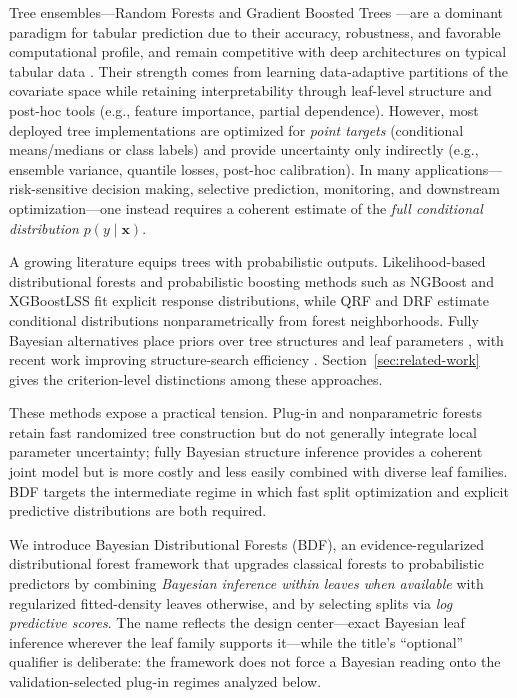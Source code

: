 \documentclass[10pt]{article} %
\begin{document}
Tree ensembles---Random Forests \citep{breiman2001random} and Gradient Boosted Trees \citep{friedman2001greedy,chen2016xgboost,ke2017lightgbm}---are a dominant paradigm for tabular prediction due to their accuracy, robustness, and favorable computational profile, and remain competitive with deep architectures on typical tabular data \citep{grinsztajn2022why}.
Their strength comes from learning data-adaptive partitions of the covariate space while retaining interpretability through leaf-level structure and post-hoc tools (e.g., feature importance, partial dependence).
However, most deployed tree implementations are optimized for \emph{point targets} (conditional means/medians or class labels) and provide uncertainty only indirectly (e.g., ensemble variance, quantile losses, post-hoc calibration).
In many applications---risk-sensitive decision making, selective prediction, monitoring, and downstream optimization---one instead requires a coherent estimate of the \emph{full conditional distribution} $p(y\mid \mathbf{x})$.

A growing literature equips trees with probabilistic outputs. Likelihood-based distributional forests \citep{schlosser2019distributional} and probabilistic boosting methods such as NGBoost and XGBoostLSS \citep{duan2020ngboost,marz2019xgboostlss} fit explicit response distributions, while QRF and DRF \citep{meinshausen2006quantile,cevid2022distributional} estimate conditional distributions nonparametrically from forest neighborhoods. Fully Bayesian alternatives place priors over tree structures and leaf parameters \citep{denison1998bayesian,chipman2010bart}, with recent work improving structure-search efficiency \citep{he2019xbart,sullivan2024maptree}. Section~\ref{sec:related-work} gives the criterion-level distinctions among these approaches.

These methods expose a practical tension. Plug-in and nonparametric forests retain fast randomized tree construction but do not generally integrate local parameter uncertainty; fully Bayesian structure inference provides a coherent joint model but is more costly and less easily combined with diverse leaf families. BDF targets the intermediate regime in which fast split optimization and explicit predictive distributions are both required.

We introduce Bayesian Distributional Forests (BDF), an evidence-regularized distributional forest framework that upgrades classical forests to probabilistic predictors by combining \emph{Bayesian inference within leaves when available} with regularized fitted-density leaves otherwise, and by selecting splits via \emph{log predictive scores}. The name reflects the design center---exact Bayesian leaf inference wherever the leaf family supports it---while the title's ``optional'' qualifier is deliberate: the framework does not force a Bayesian reading onto the validation-selected plug-in regimes analyzed below.
\end{document}

